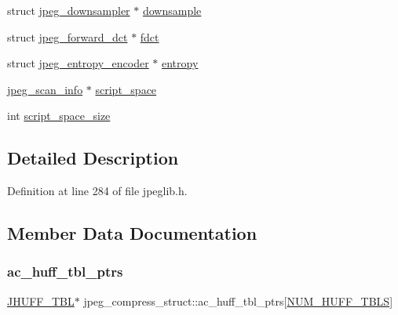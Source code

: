 \begin{DoxyCompactItemize}
\item 
struct \mbox{\hyperlink{structjpeg__downsampler}{jpeg\+\_\+downsampler}} $\ast$ \mbox{\hyperlink{structjpeg__compress__struct_a65a72b804640a0c339863f6562098113}{downsample}}
\item 
struct \mbox{\hyperlink{structjpeg__forward__dct}{jpeg\+\_\+forward\+\_\+dct}} $\ast$ \mbox{\hyperlink{structjpeg__compress__struct_ac113c777486860f0b2f3784345073a83}{fdct}}
\item 
struct \mbox{\hyperlink{structjpeg__entropy__encoder}{jpeg\+\_\+entropy\+\_\+encoder}} $\ast$ \mbox{\hyperlink{structjpeg__compress__struct_a30477f9e5f6be16823e1aff2762ae270}{entropy}}
\item 
\mbox{\hyperlink{structjpeg__scan__info}{jpeg\+\_\+scan\+\_\+info}} $\ast$ \mbox{\hyperlink{structjpeg__compress__struct_ab4a2c220ed2cda1b0d4c88518d02a229}{script\+\_\+space}}
\item 
int \mbox{\hyperlink{structjpeg__compress__struct_ae50a683b4baddef6571900ca6240b1a3}{script\+\_\+space\+\_\+size}}
\end{DoxyCompactItemize}


\subsection{Detailed Description}


Definition at line 284 of file jpeglib.\+h.



\subsection{Member Data Documentation}
\mbox{\label{structjpeg__compress__struct_a98d33cae3c8eee8f1f8d662e31cb905d}} 
\subsubsection{\texorpdfstring{ac\_huff\_tbl\_ptrs}{ac\_huff\_tbl\_ptrs}}
{\footnotesize\ttfamily \mbox{\hyperlink{structJHUFF__TBL}{J\+H\+U\+F\+F\+\_\+\+T\+BL}}$\ast$ jpeg\+\_\+compress\+\_\+struct\+::ac\+\_\+huff\+\_\+tbl\+\_\+ptrs\mbox{[}\mbox{\hyperlink{jpeglib_8h_a6b12985705944e0623b671f29dc5722e}{N\+U\+M\+\_\+\+H\+U\+F\+F\+\_\+\+T\+B\+LS}}\mbox{]}}



